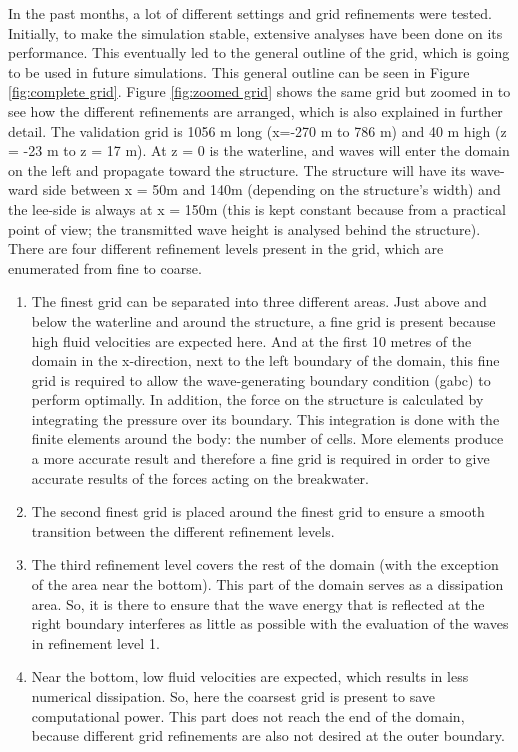 In the past months, a lot of different settings and grid refinements were tested. Initially, to make the simulation stable, extensive analyses have been done on its performance. This eventually led to the general outline of the grid, which is going to be used in future simulations. This general outline can be seen in Figure \ref{fig:complete grid}. Figure \ref{fig:zoomed grid} shows the same grid but zoomed in to see how the different refinements are arranged, which is also explained in further detail. The validation grid is 1056 m long (x=-270 m to 786 m) and 40 m high (z = -23 m to z = 17 m). At z = 0 is the waterline, and waves will enter the domain on the left and propagate toward the structure. The structure will have its wave-ward side between x = 50m and 140m (depending  on the structure's width) and the lee-side is always at x = 150m (this is kept constant because from a practical point of view; the transmitted wave height is analysed behind the structure). There are four different refinement levels present in the grid, which are enumerated from fine to coarse.
\begin{enumerate}
    \item The finest grid can be separated into three different areas. Just above and below the waterline and around the structure, a fine grid is present because high fluid velocities are expected here. And at the first 10 metres of the domain in the x-direction, next to the left boundary of the domain, this fine grid is required to allow the wave-generating boundary condition (\acrshort{gabc}) to perform optimally. In addition, the force on the structure is calculated by integrating the pressure over its boundary. This integration is done with the finite elements around the body: the number of cells. More elements produce a more accurate result and therefore a fine grid is required in order to give accurate results of the forces acting on the breakwater.
    \item The second finest grid is placed around the finest grid to ensure a smooth transition between the different refinement levels.
    \item The third refinement level covers the rest of the domain (with the exception of the area near the bottom). This part of the domain serves as a dissipation area. So, it is there to ensure that the wave energy that is reflected at the right boundary interferes as little as possible with the evaluation of the waves in refinement level 1. 
    \item Near the bottom, low fluid velocities are expected, which results in less numerical dissipation. So, here the coarsest grid is present to save computational power. This part does not reach the end of the domain, because different grid refinements are also not desired at the outer boundary.
\end{enumerate}


